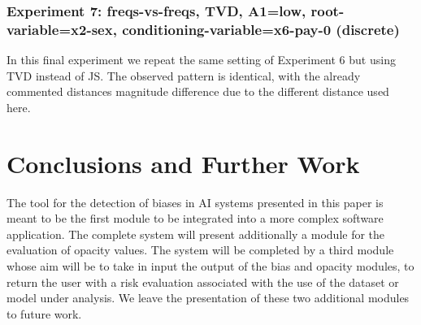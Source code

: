 \documentclass[
]{ceurart}
\begin{document}
\subsubsection{Experiment 7: freqs-vs-freqs, TVD, A1=low, root-variable=x2-sex, conditioning-variable=x6-pay-0 (discrete)}
In this final experiment we repeat the same setting of Experiment 6 but using TVD instead of JS. The observed pattern is identical, with the already commented distances magnitude difference due to the different distance used here. 

\section{Conclusions and Further Work}
\label{sec:conclusions}

The tool for the detection of biases in AI systems presented in this paper is meant to be the first module to be integrated into a more complex software application. The complete system will present additionally a module for the evaluation of opacity values. The system will be completed by a third module whose aim will be to take in input the output of the bias and opacity modules, to return the user with a risk evaluation associated with the use of the dataset or model under analysis. We leave the presentation of these two additional modules to future work.



%
%
%
\end{document}
